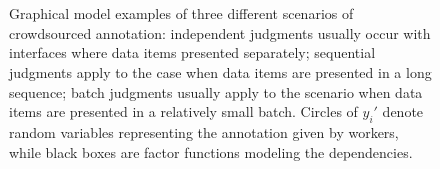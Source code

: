 \begin{figure}[!t]
  \centering
  \\
  \vspace{0.2in}
  \\
  \vspace{0.2in}
  \caption{\label{fig:worker_mode}
  Graphical model examples of three different scenarios of crowdsourced annotation: 
  independent judgments usually occur with interfaces where data items presented separately; 
  sequential judgments apply to the case when data items are presented in a long sequence;
  batch judgments usually apply to the scenario when data items are presented in a relatively small batch.  
  Circles of $y_i'$ denote random variables representing the annotation given by workers, 
  while black boxes are factor functions modeling the dependencies.  
  }
\end{figure}

